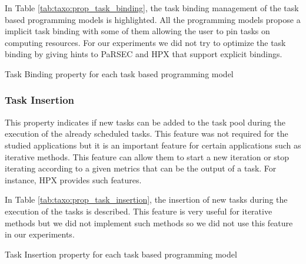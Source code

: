In Table \ref{tab:taxo:prop_task_binding}, the task binding management of the task based programming models is highlighted.
All the programming models propose a implicit task binding with some of them allowing the user to pin tasks on computing resources.
For our experiments we did not try to optimize the task binding by giving hints to PaRSEC and HPX that support explicit bindings.

\begin{table}[H]
	\caption{Task Binding property for each task based programming model \label{tab:taxo:prop_task_binding}}
	\centering
	\begin{multicols}{2}
		

		
	\end{multicols}
\end{table}

\subsubsection{Task Insertion}
This property indicates if new tasks can be added to the task pool during the execution of the already scheduled tasks.
This feature was not required for the studied applications but it is an important feature for certain applications such as iterative methods.
This feature can allow them to start a new iteration or stop iterating according to a given metrics that can be the output of a task.
For instance, HPX provides such features.

In Table \ref{tab:taxo:prop_task_insertion}, the insertion of new tasks during the execution of the tasks is described.
This feature is very useful for iterative methods but we did not implement such methods so we did not use this feature in our experiments.

\begin{table}[H]
	\caption{Task Insertion property for each task based programming model \label{tab:taxo:prop_task_insertion}}
	\centering
	\begin{multicols}{2}
		

		
	\end{multicols}
\end{table}

